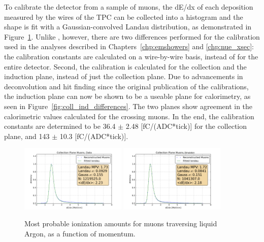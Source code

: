 To calibrate the detector from a sample of muons, the dE/dx of each deposition measured by the wires of the TPC can be collected into a histogram and the shape is fit with a Gaussian-convolved Landau distribution, as demonstrated in Figure~\ref{fig:coll_mpv_muons}.  Unlike \cite{Anderson:2012mra}, however, there are two differences performed for the calibration used in the analyses described in Chapters~\ref{chp:emshowers} and \ref{chp:nue_xsec}: the calibration constants are calculated on a wire-by-wire basis, instead of for the entire detector.  Second, the calibration is calculated for the collection and the induction plane, instead of just the collection plane.  Due to advancements in deconvolution and hit finding since the original publication of the \argoneut calibrations, the induction plane can now be shown to be a useable plane for calorimetry, as seen in Figure~\ref{fig:coll_ind_differences}.  The two planes show agreement in the calorimetric values calculated for the crossing muons.  In the end, the calibration constants are determined to be 36.4 $\pm$ 2.48 [fC/(ADC*tick)] for the collection plane, and 143 $\pm$ 10.3 [fC/(ADC*tick)].

\begin{figure}[tb]
  \centering
  \includegraphics[width=0.45\textwidth]{lartpc_figures/collection_muons_total.png}
  \includegraphics[width=0.45\textwidth]{lartpc_figures/collection_muons_total_sim.png}
  \caption[Muon dE/dx Distributions]{Most probable ionization amounts for muons traversing liquid Argon, as a function of momentum.}
  \label{fig:coll_mpv_muons}
\end{figure}

